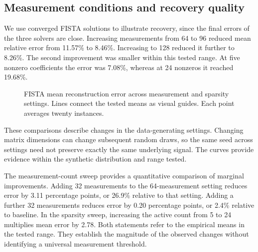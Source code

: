 \documentclass{article}
\begin{document}
\subsection{Measurement conditions and recovery quality}
We use converged FISTA solutions to illustrate recovery, since the final errors of the three solvers are close. Increasing measurements from 64 to 96 reduced mean relative error from 11.57\% to 8.46\%. Increasing to 128 reduced it further to 8.26\%. The second improvement was smaller within this tested range. At five nonzero coefficients the error was 7.08\%, whereas at 24 nonzeros it reached 19.68\%.
\begin{figure}[htbp]\centering
\begin{minipage}{0.49\linewidth}\centering
{}\end{minipage}\hfill
\begin{minipage}{0.49\linewidth}\centering
{}\end{minipage}
\caption{FISTA mean reconstruction error across measurement and sparsity settings. Lines connect the tested means as visual guides. Each point averages twenty instances.}\label{fig:recovery}
\end{figure}

These comparisons describe changes in the data-generating settings. Changing matrix dimensions can change subsequent random draws, so the same seed across settings need not preserve exactly the same underlying signal. The curves provide evidence within the synthetic distribution and range tested.


The measurement-count sweep provides a quantitative comparison of marginal improvements. Adding 32 measurements to the 64-measurement setting reduces error by 3.11 percentage points, or 26.9\% relative to that setting. Adding a further 32 measurements reduces error by 0.20 percentage points, or 2.4\% relative to baseline. In the sparsity sweep, increasing the active count from 5 to 24 multiplies mean error by 2.78. Both statements refer to the empirical means in the tested range. They establish the magnitude of the observed changes without identifying a universal measurement threshold.
\end{document}
